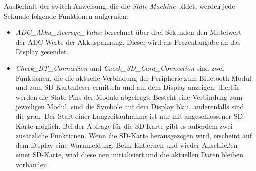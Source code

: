 Ausßerhalb der switch-Anweisung, die die \textit{State Machine} bildet, werden jede Sekunde folgende Funktionen aufgerufen:
\begin{itemize}
    \item \textit{ADC\_Akku\_Average\_Value} berechnet über drei Sekunden den Mittelwert der ADC-Werte der Akkuspannung. Dieser wird als Prozentangabe an das Display gesendet.
    \item \textit{Check\_BT\_Connection} und \textit{Check\_SD\_Card\_Connection} sind zwei Funktionen, die die aktuelle Verbindung der Peripherie zum Bluetooth-Modul und zum SD-Kartenleser ermitteln und auf dem Display anzeigen. Hierfür werden die State-Pins der Module abgefragt. Besteht eine Verbindung zum jeweiligen Modul, sind die Symbole auf dem Display blau, anderenfalls sind die grau. Der Start einer Langzeitaufnahme ist nur mit angeschlossener SD-Karte möglich.
    Bei der Abfrage für die SD-Karte gibt es außerdem zwei zusätzliche Funktionen. Wenn die SD-Karte herausgezogen wird, erscheint auf dem Display eine Warnmeldung. Beim Entfernen und wieder Anschließen einer SD-Karte, wird diese neu initialisiert und die aktuellen Daten bleiben vorhanden.
\end{itemize}



